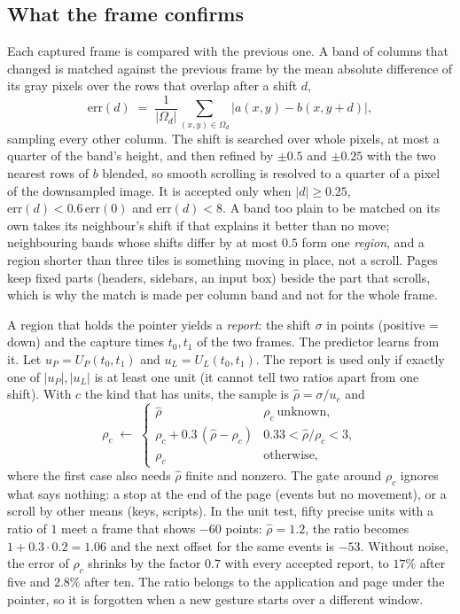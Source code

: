 \subsection{What the frame confirms}

Each captured frame is compared with the previous one. A band of columns that changed is matched against the previous frame by the
mean absolute difference of its gray pixels over the rows that overlap after a shift $d$,
\begin{equation*}
\mathrm{err}(d)\;=\;\frac1{|\Omega_d|}\sum_{(x,y)\in\Omega_d}\bigl|a(x,y)-b(x,y+d)\bigr| ,
\end{equation*}
sampling every other column. The shift is searched over whole pixels, at most a quarter of the band's height, and then refined by $\pm0.5$ and $\pm0.25$ with the two nearest
rows of $b$ blended, so smooth scrolling is resolved to a quarter of a pixel of the downsampled image. It is accepted only when
$|d|\ge0.25$, $\mathrm{err}(d)<0.6\,\mathrm{err}(0)$ and $\mathrm{err}(d)<8$. A band too plain to be matched on its own takes its
neighbour's shift if that explains it better than no move; neighbouring bands whose shifts differ by at most $0.5$ form one
\emph{region}, and a region shorter than three tiles is something moving in place, not a scroll. Pages keep fixed parts (headers,
sidebars, an input box) beside the part that scrolls, which is why the match is made per column band and not for the whole frame.

A region that holds the pointer yields a \emph{report}: the shift $\sigma$ in points (positive = down) and the capture times $t_0,t_1$ of
the two frames. The predictor learns from it. Let $u_P=U_P(t_0,t_1)$ and $u_L=U_L(t_0,t_1)$. The report is used only if exactly one of
$|u_P|,|u_L|$ is at least one unit (it cannot tell two ratios apart from one shift). With $c$ the kind that has units, the sample is
$\hat\rho=\sigma/u_c$ and
\begin{equation}\label{eq:confirm}
\rho_c\;\leftarrow\;\begin{cases}
\hat\rho & \rho_c\ \text{unknown},\\
\rho_c+0.3\,(\hat\rho-\rho_c) & 0.33<\hat\rho/\rho_c<3,\\
\rho_c & \text{otherwise,}
\end{cases}
\end{equation}
where the first case also needs $\hat\rho$ finite and nonzero. The gate around $\rho_c$ ignores what says nothing: a stop at the end of the page (events but no movement), or a scroll by other means (keys, scripts). In the
unit test, fifty precise units with a ratio of $1$ meet a frame that shows $-60$ points: $\hat\rho=1.2$, the ratio becomes $1+0.3\cdot0.2=1.06$ and the
next offset for the same events is $-53$. Without noise, the error of $\rho_c$ shrinks by the factor $0.7$ with every accepted
report, to $17\%$ after five and $2.8\%$ after ten. The ratio belongs to the application and page under the pointer, so it is forgotten when
a new gesture starts over a different window.

